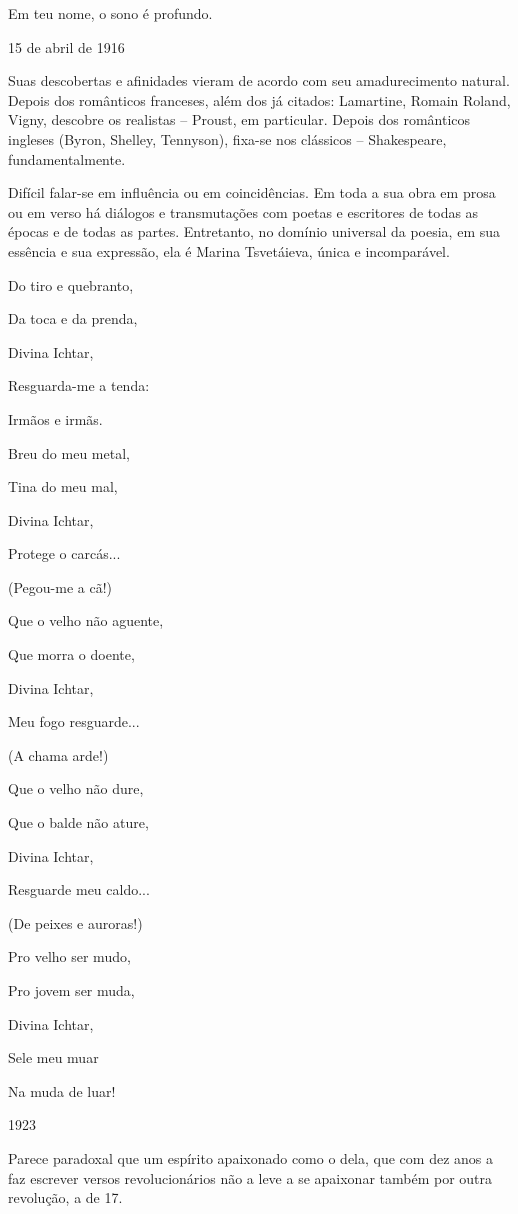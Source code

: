 Em teu nome, o sono é profundo.

15 de abril de 1916

Suas descobertas e afinidades vieram de acordo com seu amadurecimento
natural. Depois dos românticos franceses, além dos já citados:
Lamartine, Romain Roland, Vigny, descobre os realistas -- Proust, em
particular. Depois dos românticos ingleses (Byron, Shelley, Tennyson),
fixa-se nos clássicos -- Shakespeare, fundamentalmente.

Difícil falar-se em influência ou em coincidências. Em toda a sua obra
em prosa ou em verso há diálogos e transmutações com poetas e escritores
de todas as épocas e de todas as partes. Entretanto, no domínio
universal da poesia, em sua essência e sua expressão, ela é Marina
Tsvetáieva, única e incomparável.

Do tiro e quebranto,

Da toca e da prenda,

Divina Ichtar,

Resguarda-me a tenda:

Irmãos e irmãs.

Breu do meu metal,

Tina do meu mal,

Divina Ichtar,

Protege o carcás...

(Pegou-me a cã!)

Que o velho não aguente,

Que morra o doente,

Divina Ichtar,

Meu fogo resguarde...

(A chama arde!)

Que o velho não dure,

Que o balde não ature,

Divina Ichtar,

Resguarde meu caldo...

(De peixes e auroras!)

Pro velho ser mudo,

Pro jovem ser muda,

Divina Ichtar,

Sele meu muar

Na muda de luar!

1923

Parece paradoxal que um espírito apaixonado como o dela, que com dez
anos a faz escrever versos revolucionários não a leve a se apaixonar
também por outra revolução, a de 17.

